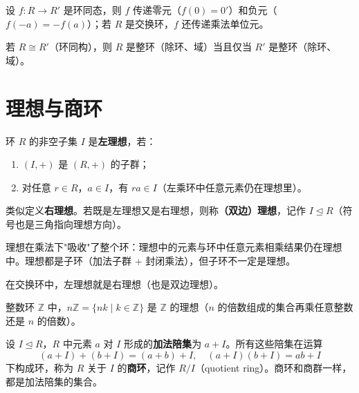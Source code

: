 \begin{theorem}[定理 2：环同态传递零元与负元]
设 $f\colon R \to R'$ 是环同态，则 $f$ 传递零元（$f(0) = 0'$）和负元（$f(-a) = -f(a)$）；若 $R$ 是交换环，$f$ 还传递乘法单位元。
\end{theorem}

\begin{theorem}
若 $R \cong R'$（环同构），则 $R$ 是整环（除环、域）当且仅当 $R'$ 是整环（除环、域）。
\end{theorem}

\section{理想与商环}

\begin{definition}[理想（定义 2.10）]
环 $R$ 的非空子集 $I$ 是\textbf{左理想}，若：
\begin{enumerate}
  \item $(I, +)$ 是 $(R, +)$ 的子群；
  \item 对任意 $r \in R$，$a \in I$，有 $ra \in I$（左乘环中任意元素仍在理想里）。
\end{enumerate}
类似定义\textbf{右理想}。若既是左理想又是右理想，则称\textbf{（双边）理想}，记作 $I \trianglelefteq R$（符号也是三角指向理想方向）。
\end{definition}

\begin{note}
理想在乘法下"吸收"了整个环：理想中的元素与环中任意元素相乘结果仍在理想中。理想都是子环（加法子群 + 封闭乘法），但子环不一定是理想。
\end{note}

\begin{proposition}[命题 2.6：交换环中的理想]
在交换环中，左理想就是右理想（也是双边理想）。
\end{proposition}

\begin{proposition}[命题 2.7：整数倍构成理想]
整数环 $\mathbb{Z}$ 中，$n\mathbb{Z} = \{nk \mid k \in \mathbb{Z}\}$ 是 $\mathbb{Z}$ 的理想（$n$ 的倍数组成的集合再乘任意整数还是 $n$ 的倍数）。
\end{proposition}

\begin{definition}[商环（定义 2.11）]
设 $I \trianglelefteq R$，$R$ 中元素 $a$ 对 $I$ 形成的\textbf{加法陪集}为 $a + I$。所有这些陪集在运算
\[
  (a + I) + (b + I) = (a+b) + I, \quad (a+I)(b+I) = ab + I
\]
下构成环，称为 $R$ 关于 $I$ 的\textbf{商环}，记作 $R/I$（quotient ring）。商环和商群一样，都是加法陪集的集合。
\end{definition}


